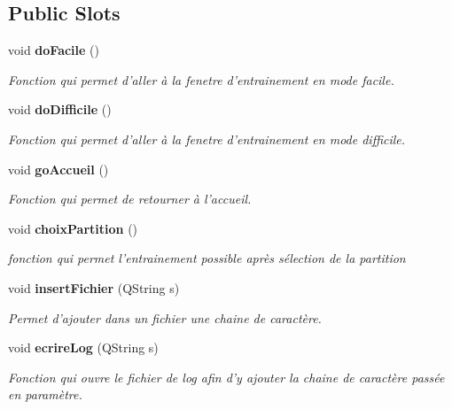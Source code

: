\subsection*{Public Slots}
\begin{DoxyCompactItemize}
\item 
void {\bf do\-Facile} ()\label{class_entrainement_page1_aee45c5abd549739198a42206db0eb869}

\begin{DoxyCompactList}\small\item\em Fonction qui permet d'aller à la fenetre d'entrainement en mode facile. \end{DoxyCompactList}\item 
void {\bf do\-Difficile} ()\label{class_entrainement_page1_a6d9fb6299b60a36569fe21202995fa20}

\begin{DoxyCompactList}\small\item\em Fonction qui permet d'aller à la fenetre d'entrainement en mode difficile. \end{DoxyCompactList}\item 
void {\bf go\-Accueil} ()\label{class_entrainement_page1_a27861dfdf502f6edae27f650cba4399c}

\begin{DoxyCompactList}\small\item\em Fonction qui permet de retourner à l'accueil. \end{DoxyCompactList}\item 
void {\bf choix\-Partition} ()\label{class_entrainement_page1_a5350caf23183fcd9e52b5ab06c738454}

\begin{DoxyCompactList}\small\item\em fonction qui permet l'entrainement possible après sélection de la partition \end{DoxyCompactList}\item 
void {\bf insert\-Fichier} (Q\-String s)
\begin{DoxyCompactList}\small\item\em Permet d'ajouter dans un fichier une chaine de caractère. \end{DoxyCompactList}\item 
void {\bf ecrire\-Log} (Q\-String s)
\begin{DoxyCompactList}\small\item\em Fonction qui ouvre le fichier de log afin d'y ajouter la chaine de caractère passée en paramètre. \end{DoxyCompactList}\end{DoxyCompactItemize}
